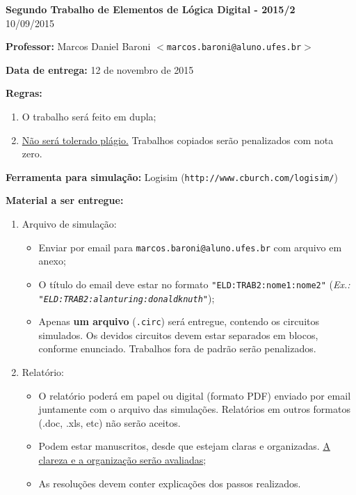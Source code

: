 \documentclass{article}
\newcommand{\titulo}[1]{{\bf #1}}
\newcommand{\itspc}{
  \vspace{-8pt}
  \setlength\itemsep{-2pt}
}
\begin{document}

\begin{center}
{\Large \bf Segundo Trabalho de Elementos de Lógica Digital - 2015/2}
\\
10/09/2015
\vspace{5mm}
\end{center}

\noindent
\titulo{Professor:} Marcos Daniel Baroni $<$\texttt{marcos.baroni@aluno.ufes.br}$>$

\noindent
\titulo{Data de entrega:} 12 de novembro de 2015

\noindent
\titulo{Regras:}
\begin{enumerate}
  \itspc
  \item O trabalho será feito em dupla;
  \item \underline{Não será tolerado plágio.} Trabalhos copiados serão penalizados com nota zero.
\end{enumerate}

\noindent
\titulo{Ferramenta para simulação:} Logisim (\texttt{http://www.cburch.com/logisim/})

\noindent
\titulo{Material a ser entregue:}
\begin{enumerate}
  \itspc
  \item{Arquivo de simulação}:
  \begin{itemize}
    \itspc
    \item{Enviar por email para \texttt{marcos.baroni@aluno.ufes.br} com arquivo em anexo;}
	\item{O título do email deve estar no formato \texttt{"ELD:TRAB2:nome1:nome2"} ({\it Ex.: \texttt{"ELD:TRAB2:alanturing:donaldknuth"}});}
	\item{Apenas {\bf um arquivo} (\texttt{.circ}) será entregue, contendo os circuitos simulados. Os devidos circuitos devem estar separados em blocos, conforme enunciado.
		Trabalhos fora de padrão serão penalizados.}
  \end{itemize}
  \item{Relatório:}
  \begin{itemize}
    \itspc
	\item{O relatório poderá em papel ou digital (formato PDF) enviado por email juntamente com o arquivo das simulações. Relatórios em outros formatos (.doc, .xls, etc) não serão aceitos.}
	\item{Podem estar manuscritos, desde que estejam claras e organizadas. \underline{A clareza e a organização serão avaliadas};}
    \item{As resoluções devem conter explicações dos passos realizados.}
  \end{itemize}
\end{enumerate}
\end{document}
